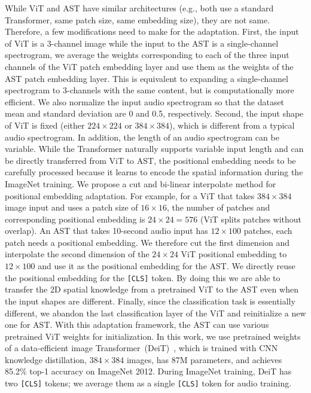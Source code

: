 \documentclass[a4paper]{article}
\begin{document}


While ViT and AST have similar architectures (e.g., both use a standard Transformer, same patch size, same embedding size), they are not same. Therefore, a few modifications need to make for the adaptation. First, the input of ViT is a 3-channel image while the input to the AST is a single-channel spectrogram, we average the weights corresponding to each of the three input channels of the ViT patch embedding layer and use them as the weights of the AST patch embedding layer. This is equivalent to expanding a single-channel spectrogram to 3-channels with the same content, but is computationally more efficient. We also normalize the input audio spectrogram so that the dataset mean and standard deviation are 0 and 0.5, respectively. Second, the input shape of ViT is fixed (either $224\times224$ or $384\times384$), which is different from a typical audio spectrogram. In addition, the length of an audio spectrogram can be variable. While the Transformer naturally supports variable input length and can be directly transferred from ViT to AST, the positional embedding needs to be carefully processed because it learns to encode the spatial information during the ImageNet training. We propose a cut and bi-linear interpolate method for positional embedding adaptation. For example, for a ViT that takes $384\times384$ image input and uses a patch size of $16\times16$, the number of patches and corresponding positional embedding is $24\times24=576$ (ViT splits patches without overlap). An AST that takes 10-second audio input has $12\times100$ patches, each patch needs a positional embedding. We therefore cut the first dimension and interpolate the second dimension of the $24\times24$ ViT positional embedding to $12\times100$ and use it as the positional embedding for the AST. We directly reuse the positional embedding for the \texttt{[CLS]} token. By doing this we are able to transfer the 2D spatial knowledge from a pretrained ViT to the AST even when the input shapes are different. Finally, since the classification task is essentially different, we abandon the last classification layer of the ViT and reinitialize a new one for AST. With this adaptation framework, the AST can use various pretrained ViT weights for initialization. In this work, we use pretrained weights of a data-efficient image Transformer~(DeiT)~\cite{touvron2020deit}, which is trained with CNN knowledge distillation, $384\times384$ images, has 87M parameters, and achieves 85.2\% top-1 accuracy on ImageNet 2012. During ImageNet training, DeiT has two \texttt{[CLS]} tokens; we average them as a single \texttt{[CLS]} token for audio training.
\end{document}
